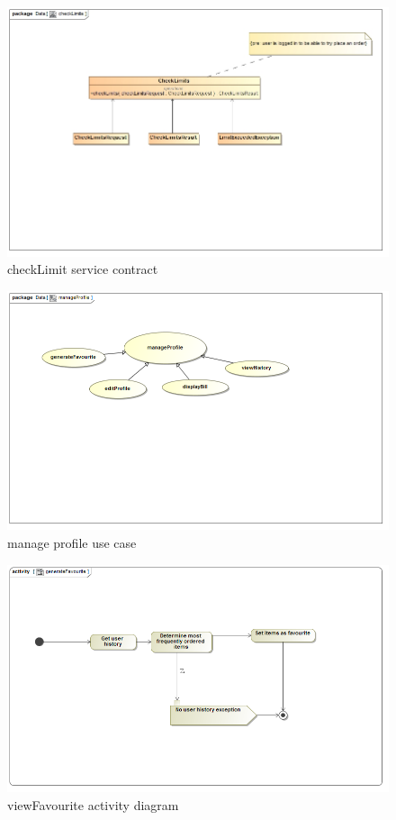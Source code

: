 \documentclass[a4paper,12pt]{article}
\begin{document}
\begin{figure}[H]
	\centering
	\includegraphics[width=1.0\textwidth]{images/checkLimitsSC.jpg}
	\caption{checkLimit service contract}
\end{figure}

\begin{figure}[H]
  \centering
    \includegraphics[width=1.0\textwidth]{images/manageProfile.png}
    \caption{manage profile use case} 
\end{figure}

\begin{figure}[H]
  \centering
    \includegraphics[width=1.0\textwidth]{images/generateFavourite.png}
    \caption{viewFavourite activity diagram} 
\end{figure}
\end{document}
